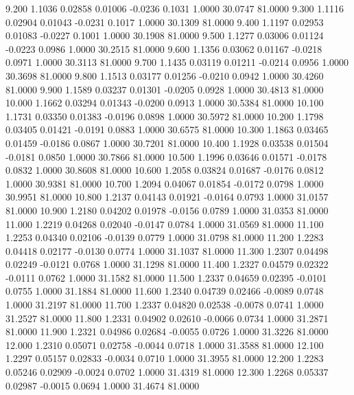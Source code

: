    9.200   1.1036   0.02858   0.01006  -0.0236   0.1031   1.0000  30.0747  81.0000
   9.300   1.1116   0.02904   0.01043  -0.0231   0.1017   1.0000  30.1309  81.0000
   9.400   1.1197   0.02953   0.01083  -0.0227   0.1001   1.0000  30.1908  81.0000
   9.500   1.1277   0.03006   0.01124  -0.0223   0.0986   1.0000  30.2515  81.0000
   9.600   1.1356   0.03062   0.01167  -0.0218   0.0971   1.0000  30.3113  81.0000
   9.700   1.1435   0.03119   0.01211  -0.0214   0.0956   1.0000  30.3698  81.0000
   9.800   1.1513   0.03177   0.01256  -0.0210   0.0942   1.0000  30.4260  81.0000
   9.900   1.1589   0.03237   0.01301  -0.0205   0.0928   1.0000  30.4813  81.0000
  10.000   1.1662   0.03294   0.01343  -0.0200   0.0913   1.0000  30.5384  81.0000
  10.100   1.1731   0.03350   0.01383  -0.0196   0.0898   1.0000  30.5972  81.0000
  10.200   1.1798   0.03405   0.01421  -0.0191   0.0883   1.0000  30.6575  81.0000
  10.300   1.1863   0.03465   0.01459  -0.0186   0.0867   1.0000  30.7201  81.0000
  10.400   1.1928   0.03538   0.01504  -0.0181   0.0850   1.0000  30.7866  81.0000
  10.500   1.1996   0.03646   0.01571  -0.0178   0.0832   1.0000  30.8608  81.0000
  10.600   1.2058   0.03824   0.01687  -0.0176   0.0812   1.0000  30.9381  81.0000
  10.700   1.2094   0.04067   0.01854  -0.0172   0.0798   1.0000  30.9951  81.0000
  10.800   1.2137   0.04143   0.01921  -0.0164   0.0793   1.0000  31.0157  81.0000
  10.900   1.2180   0.04202   0.01978  -0.0156   0.0789   1.0000  31.0353  81.0000
  11.000   1.2219   0.04268   0.02040  -0.0147   0.0784   1.0000  31.0569  81.0000
  11.100   1.2253   0.04340   0.02106  -0.0139   0.0779   1.0000  31.0798  81.0000
  11.200   1.2283   0.04418   0.02177  -0.0130   0.0774   1.0000  31.1037  81.0000
  11.300   1.2307   0.04498   0.02249  -0.0121   0.0768   1.0000  31.1298  81.0000
  11.400   1.2327   0.04579   0.02322  -0.0111   0.0762   1.0000  31.1582  81.0000
  11.500   1.2337   0.04659   0.02395  -0.0101   0.0755   1.0000  31.1884  81.0000
  11.600   1.2340   0.04739   0.02466  -0.0089   0.0748   1.0000  31.2197  81.0000
  11.700   1.2337   0.04820   0.02538  -0.0078   0.0741   1.0000  31.2527  81.0000
  11.800   1.2331   0.04902   0.02610  -0.0066   0.0734   1.0000  31.2871  81.0000
  11.900   1.2321   0.04986   0.02684  -0.0055   0.0726   1.0000  31.3226  81.0000
  12.000   1.2310   0.05071   0.02758  -0.0044   0.0718   1.0000  31.3588  81.0000
  12.100   1.2297   0.05157   0.02833  -0.0034   0.0710   1.0000  31.3955  81.0000
  12.200   1.2283   0.05246   0.02909  -0.0024   0.0702   1.0000  31.4319  81.0000
  12.300   1.2268   0.05337   0.02987  -0.0015   0.0694   1.0000  31.4674  81.0000
